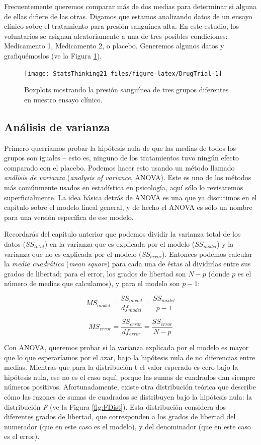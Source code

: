 \documentclass[
  12pt,
]{book}
\begin{document}
Frecuentemente queremos comparar más de dos medias para determinar si alguna de ellas difiere de las otras. Digamos que estamos analizando datos de un ensayo clínico sobre el tratamiento para presión sanguínea alta. En este estudio, los voluntarios se asignan aleatoriamente a una de tres posibles condiciones: Medicamento 1, Medicamento 2, o placebo. Generemos algunos datos y grafiquémoslos (ve la Figura \ref{fig:DrugTrial}).

\begin{figure}
\texttt{[image: StatsThinking21\_files/figure-latex/DrugTrial-1]} \caption{Boxplots mostrando la presión sanguínea de tres grupos diferentes en nuestro ensayo clínico.}\label{fig:DrugTrial}
\end{figure}

\hypertarget{ANOVA}{%
\subsection{Análisis de varianza}\label{ANOVA}}

Primero querríamos probar la hipótesis nula de que las medias de todos los grupos son iguales -- esto es, ninguno de los tratamientos tuvo ningún efecto comparado con el placebo. Podemos hacer esto usando un método llamado \emph{análisis de varianza} (\emph{analysis of variance}, ANOVA). Este es uno de los métodos más comúnmente usados en estadística en psicología, aquí sólo lo revisaremos superficialmente. La idea básica detrás de ANOVA es una que ya discutimos en el capítulo sobre el modelo lineal general, y de hecho el ANOVA es sólo un nombre para una versión específica de ese modelo.

Recordarás del capítulo anterior que podemos dividir la varianza total de los datos (\(SS_{total}\)) en la varianza que es explicada por el modelo (\(SS_{model}\)) y la varianza que no es explicada por el modelo (\(SS_{error}\)). Entonces podemos calcular la \emph{media cuadrática} (\emph{mean square}) para cada una de éstas al dividirlas entre sus grados de libertad; para el error, los grados de libertad son \(N - p\) (donde \(p\) es el número de medias que calculamos), y para el modelo son \(p - 1\):

\[
MS_{model} =\frac{SS_{model}}{df_{model}}= \frac{SS_{model}}{p-1}
\]

\[
MS_{error} = \frac{SS_{error}}{df_{error}} = \frac{SS_{error}}{N - p}
\]

Con ANOVA, queremos probar si la varianza explicada por el modelo es mayor que lo que esperaríamos por el azar, bajo la hipótesis nula de no diferencias entre medias. Mientras que para la distribución t el valor esperado es cero bajo la hipótesis nula, ese no es el caso aquí, porque las sumas de cuadrados dan siempre números positivos. Afortunadamente, existe otra distribución teórica que describe cómo las razones de sumas de cuadrados se distribuyen bajo la hipótesis nula: la distribución \emph{F} (ve la Figura \ref{fig:FDist}). Esta distribución considera dos diferentes grados de libertad, que corresponden a los grados de libertad del numerador (que en este caso es el modelo), y del denominador (que en este caso es el error).
\end{document}
